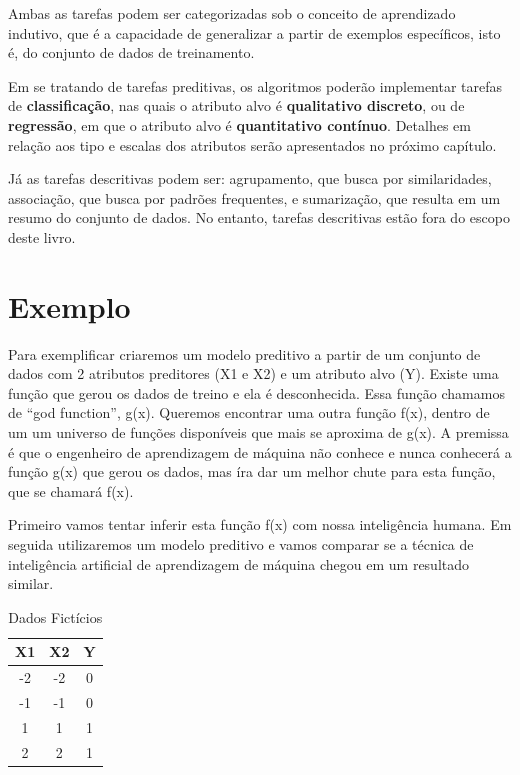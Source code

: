 \documentclass[a4paper,12pt]{book}
\begin{document}
Ambas as tarefas podem ser categorizadas sob o conceito de aprendizado indutivo, que é a capacidade de generalizar a partir de exemplos específicos, isto é, do conjunto de dados de treinamento.

Em se tratando de tarefas preditivas, os algoritmos poderão implementar tarefas de \textbf{classificação}, nas quais o atributo alvo é \textbf{qualitativo discreto}, ou de \textbf{regressão}, em que o atributo alvo é \textbf{quantitativo contínuo}. Detalhes em relação aos tipo e escalas dos atributos serão apresentados no próximo capítulo.

Já as tarefas descritivas podem ser: agrupamento, que busca por similaridades, associação, que busca por padrões frequentes, e sumarização, que resulta em um resumo do conjunto de dados. No entanto, tarefas descritivas estão fora do escopo deste livro.

\chapter{Exemplo}

Para exemplificar criaremos um modelo preditivo a partir de um  conjunto de dados com 2 atributos preditores (X1 e X2) e um atributo alvo (Y). Existe uma função que gerou os dados de treino e ela é desconhecida. Essa função chamamos de ``god function'', g(x). Queremos encontrar uma outra função f(x), dentro de um um universo de funções disponíveis que mais se aproxima de g(x). A premissa é que o engenheiro de aprendizagem de máquina não conhece e nunca conhecerá a função g(x) que gerou os dados, mas íra dar um melhor chute para esta função, que se chamará f(x).

Primeiro vamos tentar inferir esta função f(x) com nossa inteligência humana. Em seguida utilizaremos um modelo preditivo e vamos comparar se a técnica de inteligência artificial de aprendizagem de máquina chegou em um resultado similar.

\begin{table}[h]
	\centering
	\begin{tabular}{ccc}
	 X1 & X2 & Y \\
	\hline
	-2  &  -2 & 0 \\
	-1  &  -1 & 0 \\
	 1  &   1 & 1 \\
	 2  &   2 & 1 \\
	\hline
	\end{tabular}
	\caption{Dados Fictícios}
	\label{tb:dadosficticios}
\end{table}
\end{document}
